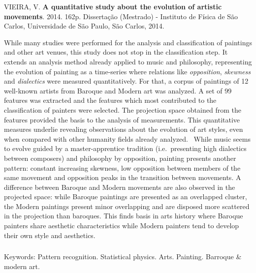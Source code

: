 \afterpage{\blankpage}

\begin{abstract2}
\vspace{-10mm}
VIEIRA, V. \textbf{A quantitative study about the evolution of artistic movements}. 2014. 162p. Dissertação (Mestrado) - Instituto de Física de São Carlos, Universidade de São Paulo, São Carlos, 2014.
\vspace{15mm}

  While many studies were performed for the analysis and
  classification of paintings and other art venues, this study does
  not stop in the classification step. It extends an analysis method
  already applied to music and philosophy, representing the evolution
  of painting as a time-series where relations like
  \textit{opposition}, \textit{skewness} and \textit{dialectics} were
  measured quantitatively. For that, a corpus of paintings of 12
  well-known artists from Baroque and Modern art was analyzed. A set
  of 99 features was extracted and the features which most contributed
  to the classification of painters were selected. The projection
  space obtained from the features provided the basis to the analysis
  of measurements. This quantitative measures underlie revealing
  observations about the evolution of art styles, even when compared
  with other humanity fields already analyzed.~\cite{vieira} While
  music seems to evolve guided by a master-apprentice tradition
  (i.e.\ presenting high dialectics between composers) and philosophy
  by opposition, painting presents another pattern: constant
  increasing skewness, low opposition between members of the same
  movement and opposition peaks in the transition between movements. A
  difference between Baroque and Modern movements are also observed in
  the projected space: while Baroque paintings are presented as an
  overlapped cluster, the Modern paintings present minor overlapping
  and are disposed more scattered in the projection than
  baroques. This finds basis in arts history where Baroque painters
  share aesthetic characteristics while Modern painters tend to
  develop their own style and aesthetics.

$\phantom{linha em branco}$\\
Keywords: Pattern recognition. Statistical physics. Arts. Painting. Barroque \& modern art.

\end{abstract2}
